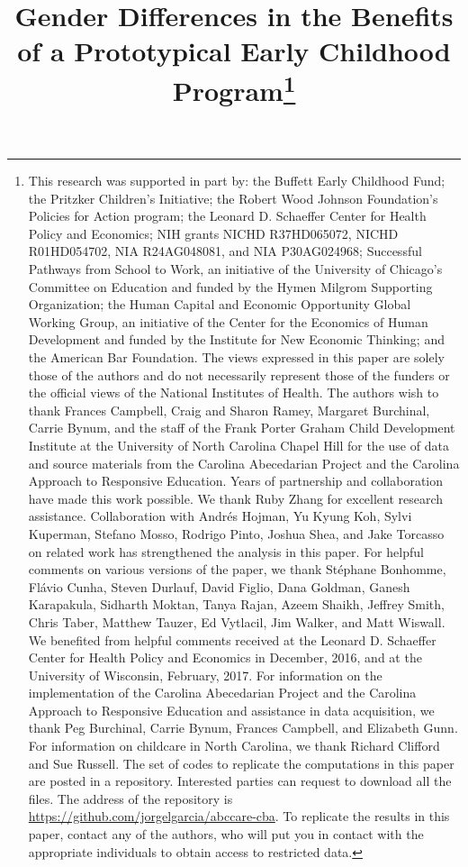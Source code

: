 \begin{titlepage}
\title{\Large \textbf{Gender Differences in the Benefits of a Prototypical Early Childhood Program}\thanks{This research was supported in part by: the Buffett Early Childhood Fund; the Pritzker Children's Initiative; the Robert Wood Johnson Foundation's Policies for Action program; the Leonard D. Schaeffer Center for Health Policy and Economics; NIH grants NICHD R37HD065072, NICHD R01HD054702, NIA R24AG048081, and NIA P30AG024968; Successful Pathways from School to Work, an initiative of the University of Chicago's Committee on Education and funded by the Hymen Milgrom Supporting Organization; the Human Capital and Economic Opportunity Global Working Group, an initiative of the Center for the Economics of Human Development and funded by the Institute for New Economic Thinking; and the American Bar Foundation. The views expressed in this paper are solely those of the authors and do not necessarily represent those of the funders or the official views of the National Institutes of Health. The authors wish to thank Frances Campbell, Craig and Sharon Ramey, Margaret Burchinal, Carrie Bynum, and the staff of the Frank Porter Graham Child Development Institute at the University of North Carolina Chapel Hill for the use of data and source materials from the Carolina Abecedarian Project and the Carolina Approach to Responsive Education. Years of partnership and collaboration have made this work possible. We thank Ruby Zhang for excellent research assistance. Collaboration with Andr\'{e}s Hojman, Yu Kyung Koh, Sylvi Kuperman, Stefano Mosso, Rodrigo Pinto, Joshua Shea, and Jake Torcasso on related work has strengthened the analysis in this paper. For helpful comments on various versions of the paper, we thank St\'{e}phane Bonhomme, Fl\'{a}vio Cunha, Steven Durlauf, David Figlio, Dana Goldman, Ganesh Karapakula, Sidharth Moktan, Tanya Rajan, Azeem Shaikh, Jeffrey Smith, Chris Taber, Matthew Tauzer, Ed Vytlacil, Jim Walker, and Matt Wiswall. We benefited from helpful comments received at the Leonard D. Schaeffer Center for Health Policy and Economics in December, 2016, and at the University of Wisconsin, February, 2017. For information on the implementation of the Carolina Abecedarian Project and the Carolina Approach to Responsive Education and assistance in data acquisition, we thank Peg Burchinal, Carrie Bynum, Frances Campbell, and Elizabeth Gunn. For information on childcare in North Carolina, we thank Richard Clifford and Sue Russell. The set of codes to replicate the computations in this paper are posted in a repository. Interested parties can request to download all the files. The address of the repository is \url{https://github.com/jorgelgarcia/abccare-cba}. To replicate the results in this paper, contact any of the authors, who will put you in contact with the appropriate individuals to obtain access to restricted data.}}


\end{titlepage}
